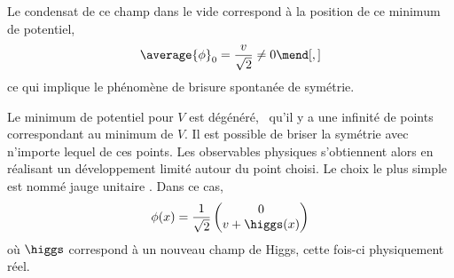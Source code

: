 \par Le condensat de ce champ dans le vide correspond à la position de ce minimum de potentiel,
\begin{equation}
\average{\phi}_0 = \frac{v}{\sqrt{2}} \neq 0
\mend[,]
\end{equation}
ce qui implique le phénomène de brisure spontanée de symétrie.
\par
Le minimum de potentiel pour $V$ est dégénéré, \ie\ qu'il y a une infinité de points correspondant au minimum de $V$.
Il est possible de briser la symétrie avec n'importe lequel de ces points.
Les observables physiques s'obtiennent alors en réalisant un développement limité autour du point choisi.
Le choix le plus simple est nommé \og jauge unitaire \fg.
Dans ce cas, %
\begin{equation}
\phi(x)
=
\frac{1}{\sqrt{2}}
\begin{pmatrix}
0 \\ v + \higgs(x)
\end{pmatrix}
\label{eq-phi_after_SSB}
\end{equation}
où $\higgs$ correspond à un nouveau champ de Higgs, cette fois-ci physiquement réel.%

